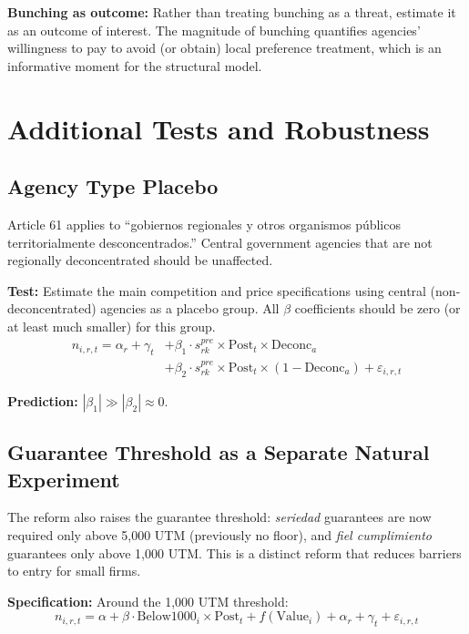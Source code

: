 \documentclass[12pt]{article}
\begin{document}
\medskip
\noindent \textbf{Bunching as outcome:} Rather than treating bunching as a threat, estimate it as an outcome of interest. The magnitude of bunching quantifies agencies' willingness to pay to avoid (or obtain) local preference treatment, which is an informative moment for the structural model.

\section{Additional Tests and Robustness}

\subsection{Agency Type Placebo}

Article 61 applies to ``gobiernos regionales y otros organismos p\'{u}blicos territorialmente desconcentrados.'' Central government agencies that are not regionally deconcentrated should be unaffected.

\medskip
\noindent \textbf{Test:} Estimate the main competition and price specifications using central (non-deconcentrated) agencies as a placebo group. All $\beta$ coefficients should be zero (or at least much smaller) for this group.
\begin{equation}\label{eq:placebo}
\begin{split}
    n_{i,r,t} = \alpha_r + \gamma_t &+ \beta_1 \cdot s_{rk}^{pre} \times \text{Post}_t \times \text{Deconc}_a \\
    &+ \beta_2 \cdot s_{rk}^{pre} \times \text{Post}_t \times (1 - \text{Deconc}_a) + \varepsilon_{i,r,t}
\end{split}
\end{equation}

\textbf{Prediction:} $|\beta_1| \gg |\beta_2| \approx 0$.

\subsection{Guarantee Threshold as a Separate Natural Experiment}

The reform also raises the guarantee threshold: \emph{seriedad} guarantees are now required only above 5,000 UTM (previously no floor), and \emph{fiel cumplimiento} guarantees only above 1,000 UTM. This is a distinct reform that reduces barriers to entry for small firms.

\medskip
\noindent \textbf{Specification:} Around the 1,000 UTM threshold:
\begin{equation}\label{eq:guarantee}
    n_{i,r,t} = \alpha + \beta \cdot \text{Below1000}_i \times \text{Post}_t + f(\text{Value}_i) + \alpha_r + \gamma_t + \varepsilon_{i,r,t}
\end{equation}
\end{document}
